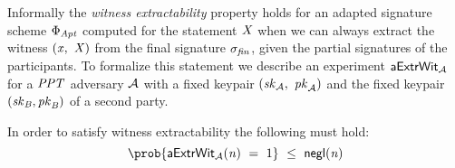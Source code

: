 \begin{definition}
    Informally the \textit{witness extractability} property holds for an adapted signature scheme $\Phi_{\mathit{Apt}}$ computed for the statement $\mathit{X}$ when we can always extract the witness
    $(\mathit{x} ,~ \mathit{X})$ from the final signature $\sigma_{\mathit{fin}}$, given the partial signatures of the participants.
    To formalize this statement we describe an experiment $\mathsf{aExtrWit_{\mathcal{A}}}$ for a $\mathit{PPT}$ adversary $\mathcal{A}$ with a fixed keypair $(\mathit{sk}_{\mathcal{A}} ,~ \mathit{pk}_{\mathcal{A}})$
    and the fixed keypair $(\mathit{sk}_{\mathit{B}}, \mathit{pk}_{\mathit{B}})$ of a second party.

    \begin{center}
        \fbox{
        \begin{varwidth}{\textwidth}
            \procedure[linenumbering]{$\procExpExt{\varN}$} {
            \varSet \opAssign \cnstEmptySet \\
            (\varMsg \opSeperate \varStatement) \opFunResult \cnstAdversary^{\procSignPtOracle{\cdot}{\varPubKeyAdv}}(\varPubKeyAdv) \\
            (\varSigPtAdv \opSeperate \varSigBob)\opFunResult \procSignPt{\varMsg}{\varSecKeyAdv}{\varSecKeyBob} \\
            \varSigAptAdv \opFunResult \cnstAdversary^{\procSignPtOracle{\cdot}{\varPubKeyAdv}}(\varPubKeyAdv \opSeperate \varSigPartAdv) \\
            \varSigFin \opFunResult \procFinSig{\varSigPtAdv}{\varSigBob} \\
            \funStar{\varWit} \opFunResult \procExtWit{\varSigFin}{\varSigBob}{\varSigAptAdv} \\
            \pcreturn (\varMsg \opNotIn \varSet \opAnd (\varStatement \opSeperate \funStar{\varWit}) \opNotIn \cnstRelation \opAnd \procVerf{\varMsg}{\varSigFin}{\varPubKeyAdv \opAddPoint \varPubKeyBob})
            }\\

            \procedure[linenumbering]{$\procSignPtOracle{\varMsg}{\varPubKeyAdv}$} {
            \varSet \opAssign \varSet \opUnion \varMsg \\
            \varSigPt \opFunResult \procSignPtSingle{\varMsg}{\varSecKey}
            \pcreturn \varSigPt
            }
        \end{varwidth}
        }
    \end{center}
    In order to satisfy witness extractability the following must hold:
    \[ \prob{\procExpExt{\varN} \opEq 1} \opSmEq \funNegl{\varN} \]
\end{definition}

